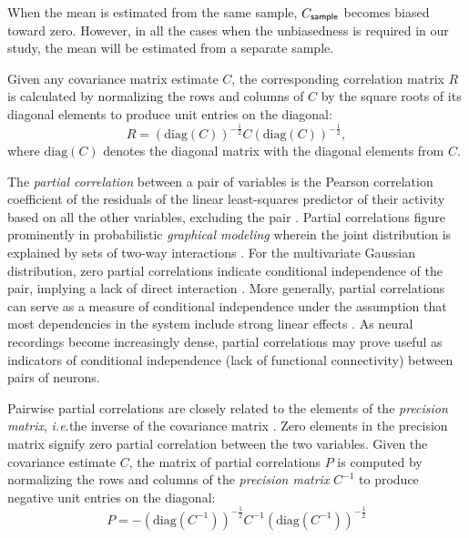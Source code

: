 {When the mean is estimated from the same sample, $C_{\sf sample}$ becomes biased toward zero.  However, in all the cases when the unbiasedness is required in our study, the mean will be estimated from a separate sample.

Given any covariance matrix estimate $C$, the corresponding correlation matrix $R$ is calculated by normalizing the rows and columns of $C$ by the square roots of its diagonal elements to produce unit entries on the diagonal:
\begin{equation}\label{eq:precision}
    R = (\mbox{diag}(C))^{-\frac 1 2} C (\mbox{diag}(C))^{-\frac 1 2},
\end{equation}
where $\mbox{diag}(C)$ denotes the diagonal matrix with the diagonal elements from $C$.

The \emph{partial correlation} between a pair of variables is the Pearson correlation coefficient of the residuals of the linear least-squares predictor of their activity based on all the other variables, excluding the pair \cite{Anderson:2003, Whittaker:1990}. Partial correlations figure prominently in probabilistic \emph{graphical modeling} wherein the joint distribution is explained by sets of two-way interactions \cite{Whittaker:1990}. For the multivariate Gaussian distribution, zero partial correlations indicate conditional independence of the pair, implying a lack of direct interaction \cite{Dempster:1972, Whittaker:1990}. More generally, partial correlations can serve as a measure of conditional independence under the assumption that most dependencies in the system include strong linear effects \cite{Whittaker:1990,Baba:2004}. As neural recordings become increasingly dense, partial correlations may prove useful as indicators of conditional independence (lack of functional connectivity) between pairs of neurons.

Pairwise partial correlations are closely related to the elements of the \emph{precision matrix}, \emph{i.e.}\;the inverse of the covariance matrix \cite{Dempster:1972,Whittaker:1990}. Zero elements in the precision matrix signify zero partial correlation between the two variables. Given the covariance estimate $C$, the matrix of partial correlations $P$ is computed by normalizing the rows and columns of the \emph{precision matrix} $C^{-1}$ to produce negative unit entries on the diagonal:
\begin{equation}\label{eq:partial}
    P = -\left(\mbox{diag}(C^{-1})\right)^{-\frac 1 2} C^{-1} \left(\mbox{diag}(C^{-1})\right)^{-\frac 1 2}
\end{equation}

}
